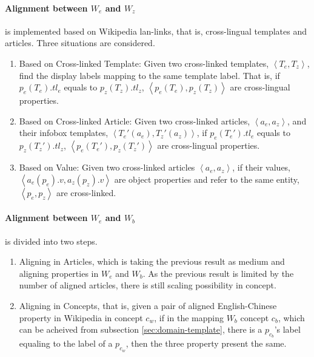 \documentclass[runningheads,a4paper]{llncs}
\begin{document}
\paragraph{Alignment between $W_e$ and $W_z$} is implemented based on Wikipedia lan-links, that is, cross-lingual templates and articles. Three situations are considered.


\begin{enumerate}[1)]
    \item Based on Cross-linked Template: Given two cross-linked templates, $\left<T_e, T_z\right>$, find the display labels mapping to the same template label. That is, if $p_e(T_e).tl_e$ equals to $p_z(T_z).tl_z$, $\left<p_e(T_e), p_z(T_z)\right>$ are cross-lingual properties.
    \item Based on Cross-linked Article: Given two cross-linked articles, $\left<a_e, a_z\right>$, and their infobox templates, $\left<T_e'(a_e), T_z'(a_z)\right>$, if $p_e(T_e').tl_e$ equals to $p_z(T_z').tl_z$, $\left<p_e(T_e'), p_z(T_z')\right>$ are cross-lingual properties.
    \item Based on Value: Given two cross-linked articles $\left<a_e, a_z\right>$, if their values, $\left<a_e(p_e).v, a_z(p_z).v\right>$ are object properties and refer to the same entity, $\left<p_e, p_z\right>$ are cross-linked.
\end{enumerate}

\paragraph{ Alignment between $W_e$ and $W_b$} is divided into two steps.
\begin{enumerate}[1)]
\item Aligning in Articles, which is taking the previous result as medium and aligning properties in $W_e$ and $W_b$. As the previous result is limited by the number of aligned articles, there is still scaling possibility in concept.
\item Aligning in Concepts, that is, given a pair of aligned English-Chinese property in Wikipedia in concept $c_w$, if in the mapping $W_b$ concept $c_b$, which can be acheived from subsection \ref{sec:domain-template}, there is a $p_{c_b}$'s label equaling to the label of a $p_{c_w}$, then the three property present the same.
\end{enumerate}
\end{document}
